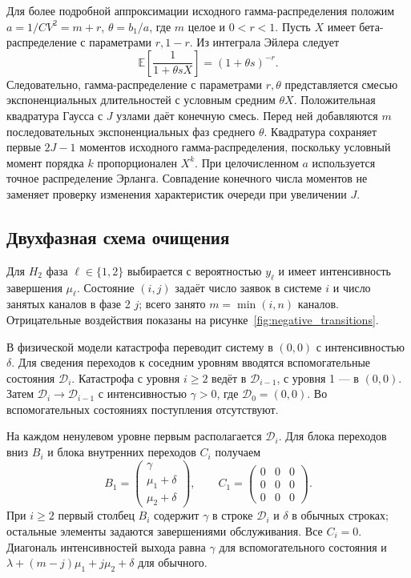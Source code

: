 \documentclass[a4paper,12pt]{article}
\begin{document}
Для более подробной аппроксимации исходного гамма-распределения положим \(a=1/CV^2=m+r\), \(\theta=b_1/a\), где \(m\) целое и \(0<r<1\). Пусть \(X\) имеет бета-распределение с параметрами \(r,1-r\). Из интеграла Эйлера \cite{nistdlmf} следует
\[
\mathbb E\!\left[\frac{1}{1+\theta sX}\right]=(1+\theta s)^{-r}.
\]
Следовательно, гамма-распределение с параметрами \(r,\theta\) представляется смесью экспоненциальных длительностей с условным средним \(\theta X\). Положительная квадратура Гаусса с \(J\) узлами даёт конечную смесь. Перед ней добавляются \(m\) последовательных экспоненциальных фаз среднего \(\theta\). Квадратура сохраняет первые \(2J-1\) моментов исходного гамма-распределения, поскольку условный момент порядка \(k\) пропорционален \(X^k\). При целочисленном \(a\) используется точное распределение Эрланга. Совпадение конечного числа моментов не заменяет проверку изменения характеристик очереди при увеличении \(J\).

\subsection{Двухфазная схема очищения}\label{sec:clearing}
Для \(H_2\) фаза \(\ell\in\{1,2\}\) выбирается с вероятностью \(y_\ell\) и имеет интенсивность завершения \(\mu_\ell\). Состояние \((i,j)\) задаёт число заявок в системе \(i\) и число занятых каналов в фазе 2 \(j\); всего занято \(m=\min(i,n)\) каналов. Отрицательные воздействия показаны на рисунке~\ref{fig:negative_transitions}.

В физической модели катастрофа переводит систему в \((0,0)\) с интенсивностью \(\delta\). Для сведения переходов к соседним уровням вводятся вспомогательные состояния \(\mathcal D_i\). Катастрофа с уровня \(i\ge2\) ведёт в \(\mathcal D_{i-1}\), с уровня 1 --- в \((0,0)\). Затем \(\mathcal D_i\to\mathcal D_{i-1}\) с интенсивностью \(\gamma>0\), где \(\mathcal D_0=(0,0)\). Во вспомогательных состояниях поступления отсутствуют.

На каждом ненулевом уровне первым располагается \(\mathcal D_i\). Для блока переходов вниз \(B_i\) и блока внутренних переходов \(C_i\) получаем
\[
B_1=\begin{pmatrix}\gamma\\\mu_1+\delta\\\mu_2+\delta\end{pmatrix},\qquad
C_1=\begin{pmatrix}0&0&0\\0&0&0\\0&0&0\end{pmatrix}.
\]
При \(i\ge2\) первый столбец \(B_i\) содержит \(\gamma\) в строке \(\mathcal D_i\) и \(\delta\) в обычных строках; остальные элементы задаются завершениями обслуживания. Все \(C_i=0\). Диагональ интенсивностей выхода равна \(\gamma\) для вспомогательного состояния и \(\lambda+(m-j)\mu_1+j\mu_2+\delta\) для обычного.
\end{document}
